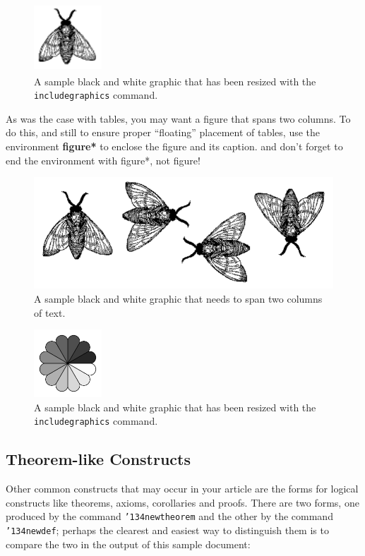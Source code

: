 \documentclass{sig-alternate-05-2015}
\begin{document}
\begin{figure}
\centering
\includegraphics[height=1in, width=1in]{fly}
\caption{A sample black and white graphic
that has been resized with the \texttt{includegraphics} command.}
\end{figure}


As was the case with tables, you may want a figure
that spans two columns.  To do this, and still to
ensure proper ``floating'' placement of tables, use the environment
\textbf{figure*} to enclose the figure and its caption.
and don't forget to end the environment with
{figure*}, not {figure}!

\begin{figure}
\centering
\includegraphics{flies}
\caption{A sample black and white graphic
that needs to span two columns of text.}
\end{figure}


\begin{figure}
\centering
\includegraphics[height=1in, width=1in]{rosette}
\caption{A sample black and white graphic that has
been resized with the \texttt{includegraphics} command.}
\vskip -6pt
\end{figure}

\subsection{Theorem-like Constructs}
Other common constructs that may occur in your article are
the forms for logical constructs like theorems, axioms,
corollaries and proofs.  There are
two forms, one produced by the
command \texttt{{\char'134}newtheorem} and the
other by the command \texttt{{\char'134}newdef}; perhaps
the clearest and easiest way to distinguish them is
to compare the two in the output of this sample document:
\end{document}
